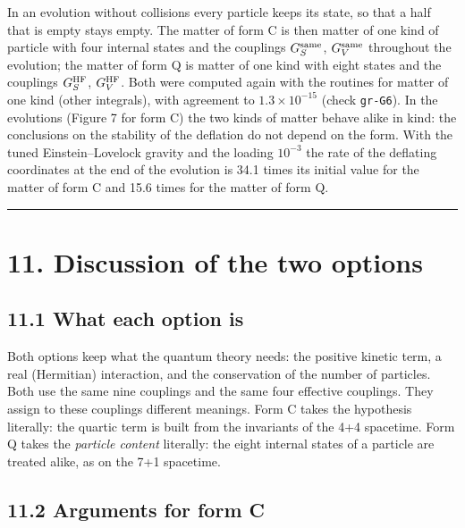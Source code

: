 \documentclass[
  10pt,
]{article}
\begin{document}
In an evolution without collisions every particle keeps its state, so
that a half that is empty stays empty. The matter of form C is then
matter of one kind of particle with four internal states and the
couplings \(G_S^{\rm same}\), \(G_V^{\rm same}\) throughout the
evolution; the matter of form Q is matter of one kind with eight states
and the couplings \(G_S^{\rm HF}\), \(G_V^{\rm HF}\). Both were computed
again with the routines for matter of one kind (other integrals), with
agreement to \(1.3\times10^{-15}\) (check \texttt{gr-G6}). In the
evolutions (Figure 7 for form C) the two kinds of matter behave alike in
kind: the conclusions on the stability of the deflation do not depend on
the form. With the tuned Einstein--Lovelock gravity and the loading
\(10^{-3}\) the rate of the deflating coordinates at the end of the
evolution is 34.1 times its initial value for the matter of form C and
15.6 times for the matter of form Q.

\begin{center}\rule{0.5\linewidth}{0.5pt}\end{center}

\hypertarget{discussion-of-the-two-options}{%
\section{11. Discussion of the two
options}\label{discussion-of-the-two-options}}

\hypertarget{what-each-option-is}{%
\subsection{11.1 What each option is}\label{what-each-option-is}}

Both options keep what the quantum theory needs: the positive kinetic
term, a real (Hermitian) interaction, and the conservation of the number
of particles. Both use the same nine couplings and the same four
effective couplings. They assign to these couplings different meanings.
Form C takes the hypothesis literally: the quartic term is built from
the invariants of the 4+4 spacetime. Form Q takes the \emph{particle
content} literally: the eight internal states of a particle are treated
alike, as on the 7+1 spacetime.

\hypertarget{arguments-for-form-c}{%
\subsection{11.2 Arguments for form C}\label{arguments-for-form-c}}
\end{document}

